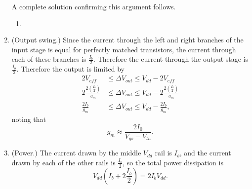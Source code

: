\documentclass{article}
\begin{document}
\begin{enumerate}
{A complete solution confirming this argument follows.

\begin{enumerate}
  \item{
       }
\end{enumerate}
}
\item{(Output swing.)
Since the current through the left and right branches of the input stage
is equal for perfectly matched transistors, the current through each of
these branches is $\frac{I_b}{2}$. Therefore the current through the output
stage is $\frac{I_b}{2}.$
Therefore the output is limited by
\begin{align*}
2V_{eff} &\leq \Delta V_{out} \leq V_{dd} - 2V_{eff} \\
2\frac{2 \left(\frac{I_b}{2}\right)}{g_m} 
  & \leq \Delta V_{out} 
    \leq V_{dd} - 2\frac{2 \left(\frac{I_b}{2}\right)}{g_m} \\
\frac{2 I_b}{g_m} &\leq \Delta V_{out} \leq V_{dd} - \frac{2 I_b}{g_m},
\end{align*}
noting that
$$
g_m \approx \frac{2 I_0}{V_{gs} - V_{th}}.
$$
}
\item{(Power.)
The current drawn by the middle $V_{dd}$ rail is $I_b$, and the current
drawn by each of the other rails is $\frac{I_b}{2}$, so the total power
dissipation is
$$
V_{dd}\left(I_b + 2\frac{I_b}{2}\right) = 2 I_b V_{dd}.
$$
}
\end{enumerate}

\pagebreak
\end{document}
